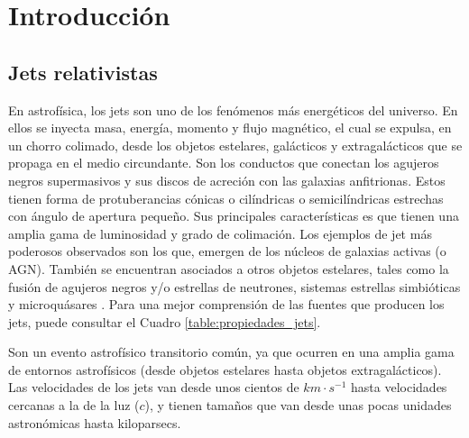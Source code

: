 \documentclass[12pt,a4paper]{book}
\begin{document}
%
%
 \chapter{Introducción}

\section{Jets relativistas}
En astrofísica, los jets son uno de los fenómenos más energéticos del universo. En ellos se inyecta masa, energía, momento y flujo magnético, el cual se expulsa, en un chorro colimado, desde los objetos
estelares, galácticos y extragalácticos que se propaga en el medio circundante. Son los conductos que conectan los agujeros negros supermasivos y sus discos de acreción con las galaxias anfitrionas.
Estos tienen forma de protuberancias cónicas o cilíndricas 
o semicilíndricas estrechas con ángulo de apertura pequeño. Sus principales características es que tienen una 
amplia gama de luminosidad y grado de colimación. 
Los ejemplos de jet más poderosos observados son los que, emergen de los núcleos de galaxias activas (o AGN). También se encuentran asociados a otros objetos estelares, tales como la fusión de agujeros negros y/o
estrellas de neutrones, sistemas estrellas simbióticas y microquásares \citep{deGouveiaDalPino:2004jy}. %
Para una mejor comprensión de las fuentes que producen los jets, puede consultar el Cuadro \ref{table:propiedades_jets}.



Son un evento astrofísico transitorio común, ya que ocurren en una amplia gama de entornos astrofísicos (desde objetos estelares hasta objetos extragalácticos). Las velocidades de los jets van desde unos cientos de 
$km \cdot s^{-1}$ hasta velocidades cercanas a la de la luz ($c$), y tienen tamaños que van desde unas pocas unidades astronómicas hasta kiloparsecs.
\end{document}
